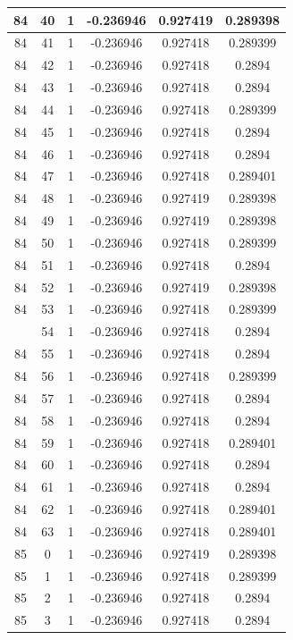 \documentclass[12pt,a4paper]{article}
\numberwithin{equation}{section}
\numberwithin{figure}{section}
\numberwithin{table}{section}
\begin{document}
\begin{longtable}{|c|c|c|c|c|c|}
84 & 40 & 1 & -0.236946 & 0.927419 & 0.289398 \\ \hline
84 & 41 & 1 & -0.236946 & 0.927418 & 0.289399 \\ \hline
84 & 42 & 1 & -0.236946 & 0.927418 & 0.2894 \\ \hline
84 & 43 & 1 & -0.236946 & 0.927418 & 0.2894 \\ \hline
84 & 44 & 1 & -0.236946 & 0.927418 & 0.289399 \\ \hline
84 & 45 & 1 & -0.236946 & 0.927418 & 0.2894 \\ \hline
84 & 46 & 1 & -0.236946 & 0.927418 & 0.2894 \\ \hline
84 & 47 & 1 & -0.236946 & 0.927418 & 0.289401 \\ \hline
84 & 48 & 1 & -0.236946 & 0.927419 & 0.289398 \\ \hline
84 & 49 & 1 & -0.236946 & 0.927419 & 0.289398 \\ \hline
84 & 50 & 1 & -0.236946 & 0.927418 & 0.289399 \\ \hline
84 & 51 & 1 & -0.236946 & 0.927418 & 0.2894 \\ \hline
84 & 52 & 1 & -0.236946 & 0.927419 & 0.289398 \\ \hline
84 & 53 & 1 & -0.236946 & 0.927418 & 0.289399 \\ \hline
\pagebreak
84 & 54 & 1 & -0.236946 & 0.927418 & 0.2894 \\ \hline
84 & 55 & 1 & -0.236946 & 0.927418 & 0.2894 \\ \hline
84 & 56 & 1 & -0.236946 & 0.927418 & 0.289399 \\ \hline
84 & 57 & 1 & -0.236946 & 0.927418 & 0.2894 \\ \hline
84 & 58 & 1 & -0.236946 & 0.927418 & 0.2894 \\ \hline
84 & 59 & 1 & -0.236946 & 0.927418 & 0.289401 \\ \hline
84 & 60 & 1 & -0.236946 & 0.927418 & 0.2894 \\ \hline
84 & 61 & 1 & -0.236946 & 0.927418 & 0.2894 \\ \hline
84 & 62 & 1 & -0.236946 & 0.927418 & 0.289401 \\ \hline
84 & 63 & 1 & -0.236946 & 0.927418 & 0.289401 \\ \hline
85 & 0 & 1 & -0.236946 & 0.927419 & 0.289398 \\ \hline
85 & 1 & 1 & -0.236946 & 0.927418 & 0.289399 \\ \hline
85 & 2 & 1 & -0.236946 & 0.927418 & 0.2894 \\ \hline
85 & 3 & 1 & -0.236946 & 0.927418 & 0.2894 \\ \hline

\end{longtable}
\end{document}
